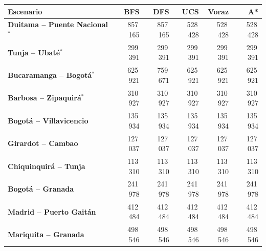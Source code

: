 \renewcommand{\arraystretch}{1.2}
\begin{tabular}{|l|r|r|r|r|r|}
\hline
\rowcolor{gray!20} \textbf{Escenario} & \textbf{BFS} & \textbf{DFS} & \textbf{UCS} & \textbf{Voraz} & \textbf{A*} \\
\hline
\textbf{Duitama -- Puente Nacional$^{*}$} & 857\,165 & 857\,165 & 528\,428 & 528\,428 & 528\,428 \\
\hline
\textbf{Tunja -- Ubaté$^{*}$} & 299\,391 & 299\,391 & 299\,391 & 299\,391 & 299\,391 \\
\hline
\textbf{Bucaramanga -- Bogotá$^{*}$} & 625\,921 & 759\,671 & 625\,921 & 625\,921 & 625\,921 \\
\hline
\textbf{Barbosa -- Zipaquirá$^{*}$} & 310\,927 & 310\,927 & 310\,927 & 310\,927 & 310\,927 \\
\hline
\textbf{Bogotá -- Villavicencio} & 135\,934 & 135\,934 & 135\,934 & 135\,934 & 135\,934 \\
\hline
\textbf{Girardot -- Cambao} & 127\,037 & 127\,037 & 127\,037 & 127\,037 & 127\,037 \\
\hline
\textbf{Chiquinquirá -- Tunja} & 113\,310 & 113\,310 & 113\,310 & 113\,310 & 113\,310 \\
\hline
\textbf{Bogotá -- Granada} & 241\,978 & 241\,978 & 241\,978 & 241\,978 & 241\,978 \\
\hline
\textbf{Madrid -- Puerto Gaitán} & 412\,484 & 412\,484 & 412\,484 & 412\,484 & 412\,484 \\
\hline
\textbf{Mariquita -- Granada} & 498\,546 & 498\,546 & 498\,546 & 498\,546 & 498\,546 \\
\hline
\end{tabular}
